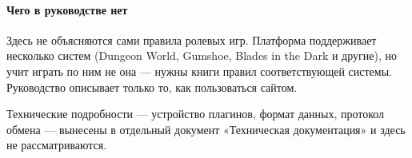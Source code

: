 \paragraph{Чего в руководстве нет}
Здесь не объясняются сами правила ролевых игр. Платформа поддерживает несколько систем (Dungeon World, Gumshoe, Blades in the Dark и другие), но учит играть по ним не она --- нужны книги правил соответствующей системы. Руководство описывает только то, как пользоваться сайтом.

Технические подробности --- устройство плагинов, формат данных, протокол обмена --- вынесены в отдельный документ «Техническая документация» и здесь не рассматриваются.
